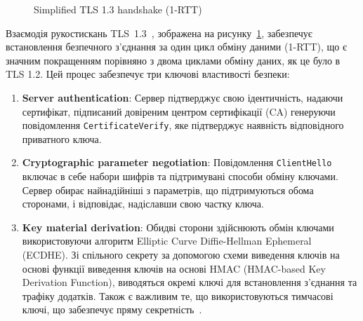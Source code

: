 \begin{figure}[!htbp]
    \caption{Simplified TLS 1.3 handshake (1-RTT)}
    \label{fig:tls13_handshake}
\end{figure}

Взаємодія рукостискань TLS~1.3~\cite{rfc8446}, зображена на рисунку~\ref{fig:tls13_handshake}, забезпечує встановлення 
безпечного з'єднання за один цикл обміну даними (1-RTT), що є значним покращенням порівняно з двома циклами обміну даних, 
як це було в TLS 1.2. Цей процес забезпечує три ключові властивості безпеки:

\begin{enumerate}
    \item \textbf{Server authentication}: Сервер підтверджує свою ідентичність, надаючи сертифікат, підписаний 
        довіреним центром сертифікації (CA) генеруючи повідомлення \texttt{CertificateVerify}, яке підтверджує 
        наявність відповідного приватного ключа.
    \item \textbf{Cryptographic parameter negotiation}: Повідомлення \texttt{ClientHello} включає в себе набори 
        шифрів та підтримувані способи обміну ключами. Сервер обирає найнадійніші з параметрів, що підтримуються 
        обома сторонами, і відповідає, надіславши свою частку ключа.
    \item \textbf{Key material derivation}: Обидві сторони здійснюють обмін ключами використовуючи алгоритм 
        Elliptic Curve Diffie-Hellman Ephemeral (ECDHE). Зі спільного секрету за допомогою схеми виведення ключів 
        на основі функції виведення ключів на основі HMAC (HMAC-based Key Derivation Function), виводяться окремі 
        ключі для встановлення з'єднання та трафіку додатків. Також є важливим те, що використовуються тимчасові 
        ключі, що забезпечує пряму секретність~\cite{cloudflare_forward_secrecy}.
\end{enumerate}

